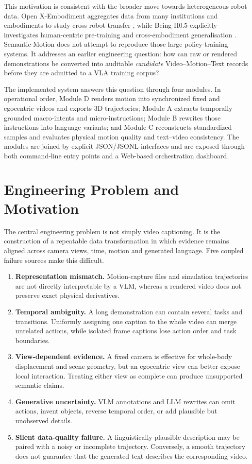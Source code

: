\documentclass[11pt,oneside]{report}
\begin{document}
This motivation is consistent with the broader move towards heterogeneous
robot data. Open X-Embodiment aggregates data from many institutions and
embodiments to study cross-robot transfer \cite{openx2024}, while Being-H0.5
explicitly investigates human-centric pre-training and cross-embodiment
generalisation \cite{luo2026beingh05}. Semantic-Motion does not attempt to
reproduce those large policy-training systems. It addresses an earlier
engineering question: how can raw or rendered demonstrations be converted into
auditable \emph{candidate} Video--Motion--Text records before they are admitted
to a VLA training corpus?

The implemented system answers this question through four modules. In
operational order, Module D renders motion into synchronized fixed and
egocentric videos and exports 3D trajectories; Module A extracts temporally
grounded macro-intents and micro-instructions; Module B rewrites those
instructions into language variants; and Module C reconstructs standardized
samples and evaluates physical motion quality and text--video consistency.
The modules are joined by explicit JSON/JSONL interfaces and are exposed through
both command-line entry points and a Web-based orchestration dashboard.

\section{Engineering Problem and Motivation}
The central engineering problem is not simply video captioning. It is the
construction of a repeatable data transformation in which evidence remains
aligned across camera views, time, motion and generated language. Five coupled
failure sources make this difficult.

\begin{enumerate}
    \item \textbf{Representation mismatch.} Motion-capture files and simulation
    trajectories are not directly interpretable by a VLM, whereas a rendered
    video does not preserve exact physical derivatives.
    \item \textbf{Temporal ambiguity.} A long demonstration can contain several
    tasks and transitions. Uniformly assigning one caption to the whole video
    can merge unrelated actions, while isolated frame captions lose action
    order and task boundaries.
    \item \textbf{View-dependent evidence.} A fixed camera is effective for
    whole-body displacement and scene geometry, but an egocentric view can
    better expose local interaction. Treating either view as complete can
    produce unsupported semantic claims.
    \item \textbf{Generative uncertainty.} VLM annotations and LLM rewrites can
    omit actions, invent objects, reverse temporal order, or add plausible but
    unobserved details.
    \item \textbf{Silent data-quality failure.} A linguistically plausible
    description may be paired with a noisy or incomplete trajectory.
    Conversely, a smooth trajectory does not guarantee that the generated text
    describes the corresponding video.
\end{enumerate}
\end{document}
